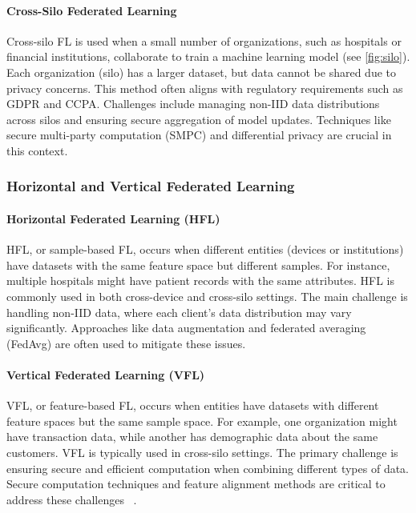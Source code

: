 \paragraph{Cross-Silo Federated Learning}
Cross-silo FL is used when a small number of organizations, such as hospitals or financial institutions, collaborate to
train a machine learning model (see \cref{fig:silo}). Each organization (silo) has a larger dataset, but data cannot be shared due to privacy concerns.
This method often aligns with regulatory requirements such as GDPR and CCPA\@. Challenges include managing non-IID data distributions
across silos and ensuring secure aggregation of model updates. Techniques like secure multi-party computation (SMPC) and differential
privacy are crucial in this context\cite{yangFederatedMachineLearning2019,zhaoFederatedLearningNonIID2018}.


\subsubsection{Horizontal and Vertical Federated Learning}

\paragraph{Horizontal Federated Learning (HFL)}
HFL, or sample-based FL, occurs when different entities (devices or institutions) have datasets with the same feature space
but different samples. For instance, multiple hospitals might have patient records with the same attributes. HFL is commonly
used in both cross-device and cross-silo settings. The main challenge is handling non-IID data, where each client’s data
distribution may vary significantly. Approaches like data augmentation and federated averaging (FedAvg) are often used to
mitigate these issues\cite{konecnyFederatedOptimizationDistributed2016}.

\paragraph{Vertical Federated Learning (VFL)}
VFL, or feature-based FL, occurs when entities have datasets with different feature spaces but the same sample space. For
example, one organization might have transaction data, while another has demographic data about the same customers. VFL is
typically used in cross-silo settings. The primary challenge is ensuring secure and efficient computation when combining
different types of data. Secure computation techniques and feature alignment methods are critical to address these challenges
~\cite{yangFederatedMachineLearning2019,chenDistributedLearningWireless2021}.

